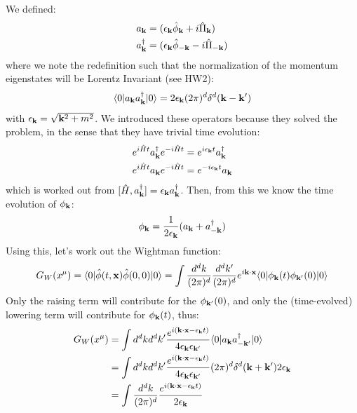 We defined:
\begin{subequations}
    \begin{align}
    a_{\mathbf{k}} &= (\epsilon_{\mathbf{k}}\hat{\phi}_{\mathbf{k}} + i\hat{\Pi}_{\mathbf{k}})
    \\ a_{\mathbf{k}}^\dagger &= (\epsilon_{\mathbf{k}}\hat{\phi}_{\mathbf{-k}} - i\hat{\Pi}_{\mathbf{-k}})
    \end{align}
\end{subequations}
where we note the redefinition such that the normalization of the momentum eigenstates will be Lorentz Invariant (see HW2):
\begin{equation}
    \langle 0 \rvert a_{\mathbf{k}}a_{\mathbf{k}}^\dagger\lvert 0 \rangle = 2\epsilon_{\mathbf{k}}(2\pi)^d\delta^d(\mathbf{k} - \mathbf{k}')
\end{equation}
with $\epsilon_{\mathbf{k}} = \sqrt{\mathbf{k}^2 + m^2}$. We introduced these operators because they solved the problem, in the sense that they have trivial time evolution:
\begin{subequations}
    \begin{align}
    e^{i\hat{H}t}a_{\mathbf{k}}^\dagger e^{-i\hat{H}t} &= e^{i\epsilon_{\mathbf{k}}t}a^\dagger_{\mathbf{k}}
    \\ e^{i\hat{H}t}a_{\mathbf{k}} e^{-i\hat{H}t} &= e^{-i\epsilon_{\mathbf{k}}t}a_{\mathbf{k}}
    \end{align}
\end{subequations}
which is worked out from $[\hat{H}, a_{\mathbf{k}}^\dagger] = \epsilon_{\mathbf{k}}a_{\mathbf{k}}^\dagger$. Then, from this we know the time evolution of $\phi_{\mathbf{k}}$:
\begin{equation}
    \phi_{\mathbf{k}} = \frac{1}{2\epsilon_{\mathbf{k}}}(a_{\mathbf{k}} + a^\dagger_{-\mathbf{k}})
\end{equation}
Using this, let's work out the Wightman function:
\begin{equation}
    G_W(x^\mu) = \langle 0 \rvert\hat{\phi}(t, \mathbf{x})\hat{\phi}(0, 0)\lvert 0 \rangle = \int \frac{d^dk}{(2\pi)^d}\frac{d^dk'}{(2\pi)^d}e^{i\mathbf{k} \cdot \mathbf{x}}\langle 0 \rvert\phi_{\mathbf{k}}(t)\phi_{\mathbf{k}'}(0)\lvert 0 \rangle
\end{equation}
Only the raising term will contribute for the $\phi_{\mathbf{k}'}(0)$, and only the (time-evolved) lowering term will contribute for $\phi_{\mathbf{k}}(t)$, thus:
\begin{equation}
    \begin{split}
        G_W(x^\mu) &= \int d^dk d^dk' \frac{e^{i(\mathbf{k} \cdot \mathbf{x} - \epsilon_{\mathbf{k}}t)}}{4\epsilon_{\mathbf{k}}\epsilon_{\mathbf{k}'}} \langle 0 \rvert a_{\mathbf{k}}a^\dagger_{-\mathbf{k}'}\lvert 0 \rangle 
        \\ &= \int d^dk d^dk' \frac{e^{i(\mathbf{k} \cdot \mathbf{x} - \epsilon_{\mathbf{k}}t)}}{4\epsilon_{\mathbf{k}}\epsilon_{\mathbf{k}'}} (2\pi)^d \delta^d(\mathbf{k} + \mathbf{k}')2\epsilon_{\mathbf{k}}
        \\ &= \int \frac{d^dk}{(2\pi)^d}\frac{e^{i(\mathbf{k} \cdot \mathbf{x} - \epsilon_{\mathbf{k}}t)}}{2\epsilon_{\mathbf{k}}}
    \end{split}
\end{equation}
